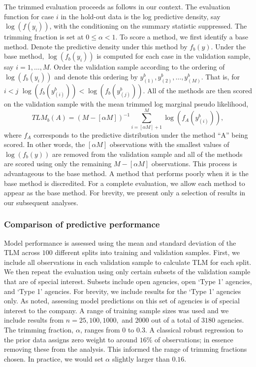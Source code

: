 \documentclass[12pt]{article}
\begin{document}
The trimmed evaluation proceeds as follows in our context.  The evaluation function for case $i$ in the hold-out data
is the log predictive density, say
$\log(f(y_i))$, with the conditioning on the 
summary statistic suppressed.  The trimming 
fraction is set at $0 \leq \alpha < 1$. To score a method,
we first identify a base method. Denote the predictive density under this method by $f_{b}(y)$.  Under the base method, $\log(f_{b}(y_i))$ is computed for each case in the 
validation sample, say $i = 1, \ldots, M$.  Order the validation
sample according to the ordering of $\log(f_{b}(y_i))$ and denote this
ordering by $y_{(1)}^b, y_{(2)}^b, \dots, y_{(M)}^b$. That is, for $i<j$
$\log(f_{b}(y_{(i)}^b))<\log(f_{b}(y_{(j)}^b))$. All of the methods are then scored on the validation sample with the mean trimmed log marginal pseudo likelihood, 
\[TLM_b(A) = (M - [\alpha M])^{-1} \sum_{i=[\alpha M]+1}^{M}
    \log(f_A(y_{(i)}^b)),\]
 where $f_A$ corresponds to the predictive
 distribution under the method ``A'' being scored.  In other words, the $[\alpha M]$ observations with the smallest values of $\log(f_{b}(y))$ are 
removed from the validation sample and all of the methods are scored using only the
remaining $M - [\alpha M]$ observations. This process is advantageous to the base method.  A method
that performs poorly when it is the base method is discredited.  For a complete evaluation, we allow each method
to appear as the base method.  For brevity, we present only a selection of results in our subsequent analyses.  

\subsubsection{Comparison of predictive performance}
Model performance is assessed
using the mean and standard deviation of the TLM 
across $100$ different splits into training and validation samples. First, we include all observations
in each validation sample to calculate TLM for each split. We then
repeat the evaluation using only certain subsets of the validation
sample that are of special interest. Subsets include open agencies,
open `Type 1' agencies, and `Type 1' agencies. For brevity, we include
results for the `Type 1' agencies only. As noted, assessing model
predictions on this set of agencies is of special interest to the
company.  A range of training sample sizes was used and we include
results from $n=25,100,1000,$ and $2000$ out of a total of $3180$ agencies. The trimming fraction, $\alpha$, ranges from $0$ to $0.3$. A classical robust regression to the prior data assigns zero weight to around $16\%$ of observations; in essence removing these from the analysis. This informed the range of trimming fractions chosen.  
In practice, we would set $\alpha$ slightly larger than $0.16$.  
\end{document}
